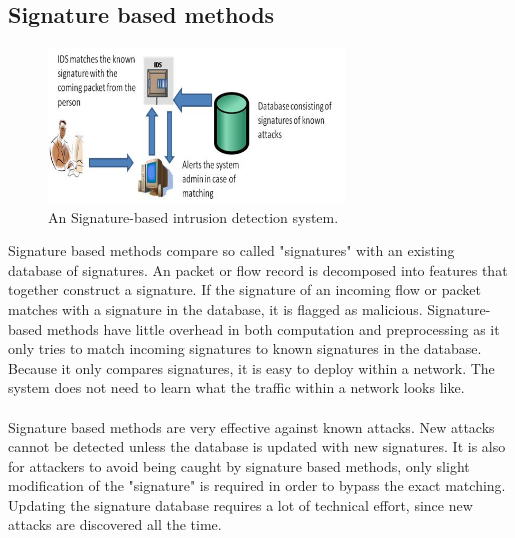 \subsection{Signature based methods}
\begin{figure}[H]
\centering
\includegraphics[width=0.7\textwidth]{Figures/Signature-based-Intrusion-Detection-System}
\decoRule
\caption[Signature based IDS]{An Signature-based intrusion detection system.}
\label{fig:Signature}
\end{figure}
\noindent Signature based methods compare so called "signatures" with an existing database of signatures. An packet or flow record is decomposed into features that together construct a signature. If the signature of an incoming flow or packet matches with a signature in the database, it is flagged as malicious. Signature-based methods have little overhead in both computation and preprocessing as it only tries to match incoming signatures to known signatures in the database. Because it only compares signatures, it is easy to deploy within a network. The system does not need to learn what the traffic within a network looks like. \\
\\
Signature based methods are very effective against known attacks. New attacks cannot be detected unless the database is updated with new signatures. It is also for attackers to avoid being caught by signature based methods, only slight modification of the "signature" is required in order to bypass the exact matching. Updating the signature database requires a lot of technical effort, since new attacks are discovered all the time.
